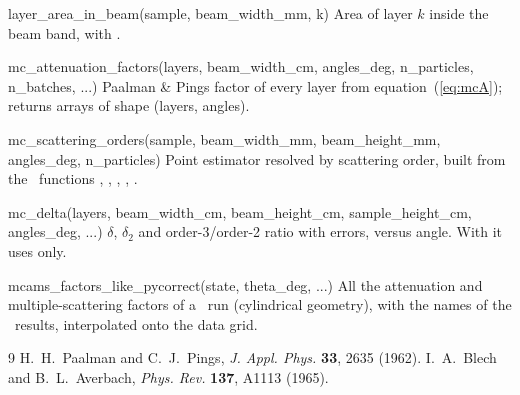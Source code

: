 \documentclass[11pt,a4paper]{report}
\begin{document}
\begin{fnbox}{layer\_area\_in\_beam(sample, beam\_width\_mm, k)}
Area of layer $k$ inside the beam band, with .
\end{fnbox}

\begin{fnbox}{mc\_attenuation\_factors(layers, beam\_width\_cm, angles\_deg, n\_particles, n\_batches, ...)}
Paalman \& Pings factor of every layer from equation~(\ref{eq:mcA}); returns
 arrays of shape (layers, angles).
\end{fnbox}

\begin{fnbox}{mc\_scattering\_orders(sample, beam\_width\_mm, beam\_height\_mm, angles\_deg, n\_particles)}
Point estimator resolved by scattering order, built from the \mcams\ functions
, ,
, ,
.
\end{fnbox}

\begin{fnbox}{mc\_delta(layers, beam\_width\_cm, beam\_height\_cm, sample\_height\_cm, angles\_deg, ...)}
$\delta$, $\delta_2$ and order-3/order-2 ratio with errors, versus angle.
With  it uses  only.
\end{fnbox}

\begin{fnbox}{mcams\_factors\_like\_pycorrect(state, theta\_deg, ...)}
All the attenuation and multiple-scattering factors of a \pyc\ run (cylindrical
geometry), with the names of the \pyc\ results, interpolated onto the data grid.
\end{fnbox}

\begin{thebibliography}{9}
 H.~H.~Paalman and C.~J.~Pings, \emph{J. Appl. Phys.} \textbf{33}, 2635 (1962).
 I.~A.~Blech and B.~L.~Averbach, \emph{Phys. Rev.} \textbf{137}, A1113 (1965).
\end{thebibliography}
\end{document}
